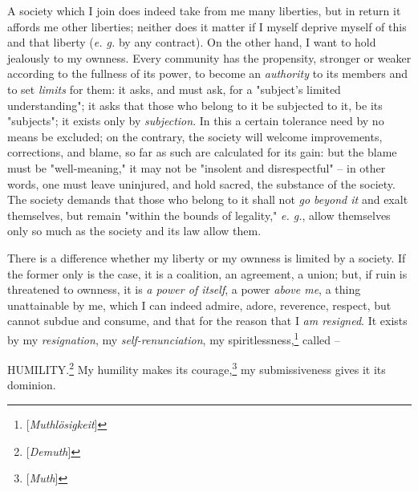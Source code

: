 A society which I join does indeed take from me many liberties, but in return 
it affords me other liberties; neither does it matter if I myself deprive 
myself of this and that liberty (\textit{e. g.} by any contract). On the other 
hand, I want to hold jealously to my ownness. Every community has the 
propensity, stronger or weaker according to the fullness of its power, to 
become an \textit{authority} to its members and to set \textit{limits} for 
them: it asks, and must ask, for a "{}subject's limited understanding"{}; it 
asks that those who belong to it be subjected to it, be its "{}subjects"{}; it 
exists only by \textit{subjection}. In this a certain tolerance need by no 
means be excluded; on the contrary, the society will welcome improvements, 
corrections, and blame, so far as such are calculated for its gain: but the 
blame must be "{}well-meaning,"{} it may not be "{}insolent and 
disrespectful"{} -- in other words, one must leave uninjured, and hold sacred, 
the substance of the society. The society demands that those who belong to it 
shall not \textit{go beyond it} and exalt themselves, but remain "{}within the 
bounds of legality,"{} \textit{e. g.}, allow themselves only so much as the 
society and its law allow them.

There is a difference whether my liberty or my ownness is limited by a 
society. If the former only is the case, it is a coalition, an agreement, a 
union; but, if ruin is threatened to ownness, it is \textit{a power of 
itself}, a power \textit{above me}, a thing unattainable by me, which I can 
indeed admire, adore, reverence, respect, but cannot subdue and consume, and 
that for the reason that I \textit{am resigned}. It exists by my 
\textit{resignation}, my \textit{self-renunciation}, my 
spiritlessness,\footnote{[\textit{Muthl\"osigkeit}]} called --

HUMILITY.\footnote{[\textit{Demuth}]} My humility makes its 
courage,\footnote{[\textit{Muth}]} my submissiveness gives it its dominion.


